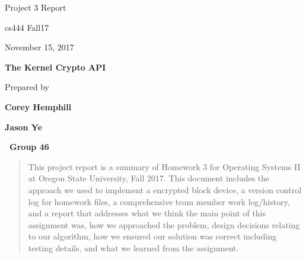 \documentclass[onecolumn, draftclsnofoot,10pt, compsoc]{IEEEtran}
\def \OperatingSystemTwo{Group 46}
\def \GroupMemberOne{Corey Hemphill}
\def \GroupMemberTwo{Jason Ye}
\def \HomeworkAssignmentOne{The Kernel Crypto API}
\def \HomeworkDueDate{November 15, 2017}
\def \DocType{	%
				Project 3 Report
				}
\begin{document}
\begin{titlepage}
    \begin{singlespace}
        \hfill 
        \par\vspace{.2in}
        \centering
        \scshape{
            \huge  \DocType \par
           	\huge cs444 Fall17 \par
            {\large\HomeworkDueDate}\par
            \vspace{.5in}
            \textbf{\Huge\HomeworkAssignmentOne}\par
            \vspace{.5in}
           
            {\large Prepared by }\par
           	\textbf{\GroupMemberOne}\par
            \textbf{\GroupMemberTwo}\par
            \vspace{5pt}
            
            \textbf{\Huge\ \OperatingSystemTwo}\par
            }
            \vspace{60pt}
        
        \begin{abstract}
        This project report is a summary of Homework 3 for Operating Systems II at Oregon State University, Fall 2017. This document includes the approach we used to implement a encrypted block device, a version control log for homework files, a comprehensive team member work log/history, and a report that addresses what we think the main point of this assignment was, how we approached the problem, design decisions relating to our algorithm, how we ensured our solution was correct including testing details, and what we learned from the assignment.
        \end{abstract} 
        
    \end{singlespace}
\end{titlepage}
\newpage
{}
\tableofcontents
\clearpage
\end{document}
